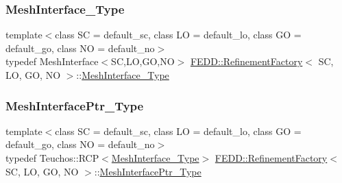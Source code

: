 \mbox{\label{classFEDD_1_1RefinementFactory_aff8bb4cd3896a419c36d4baabccbf28a}} 
\subsubsection{\texorpdfstring{Mesh\+Interface\+\_\+\+Type}{MeshInterface\_Type}}
{\footnotesize\ttfamily template$<$class SC  = default\+\_\+sc, class LO  = default\+\_\+lo, class GO  = default\+\_\+go, class NO  = default\+\_\+no$>$ \\
typedef Mesh\+Interface$<$SC,LO,GO,NO$>$ \hyperlink{classFEDD_1_1RefinementFactory}{F\+E\+D\+D\+::\+Refinement\+Factory}$<$ SC, LO, GO, NO $>$\+::\hyperlink{classFEDD_1_1RefinementFactory_aff8bb4cd3896a419c36d4baabccbf28a}{Mesh\+Interface\+\_\+\+Type}}

\mbox{\label{classFEDD_1_1RefinementFactory_a2217802fcbb1342b135d33ea70411089}} 
\subsubsection{\texorpdfstring{Mesh\+Interface\+Ptr\+\_\+\+Type}{MeshInterfacePtr\_Type}}
{\footnotesize\ttfamily template$<$class SC  = default\+\_\+sc, class LO  = default\+\_\+lo, class GO  = default\+\_\+go, class NO  = default\+\_\+no$>$ \\
typedef Teuchos\+::\+R\+CP$<$\hyperlink{classFEDD_1_1RefinementFactory_aff8bb4cd3896a419c36d4baabccbf28a}{Mesh\+Interface\+\_\+\+Type}$>$ \hyperlink{classFEDD_1_1RefinementFactory}{F\+E\+D\+D\+::\+Refinement\+Factory}$<$ SC, LO, GO, NO $>$\+::\hyperlink{classFEDD_1_1RefinementFactory_a2217802fcbb1342b135d33ea70411089}{Mesh\+Interface\+Ptr\+\_\+\+Type}}

\mbox{\label{classFEDD_1_1RefinementFactory_a1a278d01c278972af01f2996247af8ac}} 
